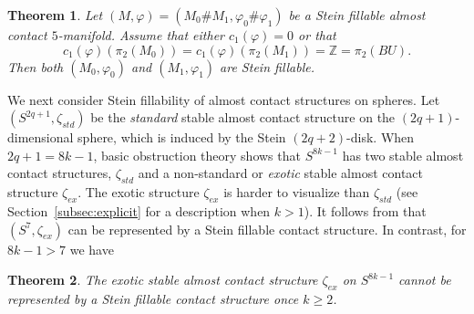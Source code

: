 \documentclass[12pt]{amsart}
\newcommand\Z{\mathbb{Z}}
\newcommand\acs{\varphi}  				%
\newtheorem{Theorem}{Theorem}[section]
\theoremstyle{remark}
\begin{document}
\begin{Theorem}\label{thm:5fill}
Let $(M, \acs) = (M_0 \# M_1, \acs_0 \# \acs_1)$ be a Stein fillable almost contact $5$-manifold.
Assume that either $c_1(\acs) = 0$ or that
%
\[ c_1(\acs)(\pi_2(M_0)) = c_1(\acs)(\pi_2(M_1)) = \Z = \pi_2(BU).\]
%
Then both $(M_0, \acs_0)$ and $(M_1, \acs_1)$ are Stein fillable.
%
%
%
\end{Theorem}
We next consider Stein fillability
of almost contact structures on  spheres. Let $(S^{2q{+}1}, \zeta_{std})$ be
the {\em standard} stable almost contact structure on the $(2q{+}1)$-dimensional sphere, which is induced by the Stein $(2q{+}2)$-disk.
When $2q{+}1 = 8k{-}1$, basic
obstruction theory shows that 
$S^{8k{-}1}$ has two stable almost contact structures, $\zeta _{std}$ and 
a non{-}standard or \emph{exotic} stable almost contact structure $\zeta _{ex}$.
The exotic structure $\zeta _{ex}$ is
harder to visualize than $\zeta_{std}$ (see Section~\ref{subsec:explicit} for
a description when $k > 1$).  It follows from \cite{BCS2, Geiges93} that 
$(S^7, \zeta_{ex})$ can be represented by a Stein fillable contact structure. 
In contrast, for $8k{-}1>7$ we have 

\begin{Theorem} \label{thm:wackyspheres}
The exotic stable almost contact structure $\zeta _{ex}$ on 
$S^{8k{-}1}$ cannot be represented by a Stein fillable contact structure once $k\geq 2$.
\end{Theorem}
\end{document}

